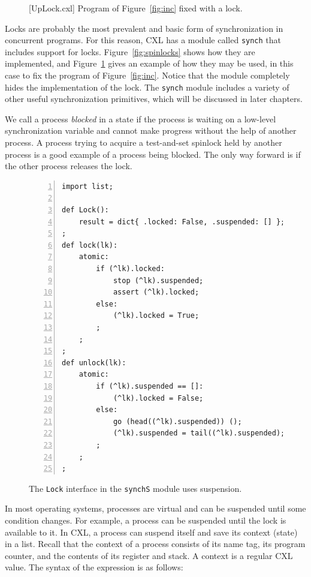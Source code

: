 \documentclass{report}
\newenvironment{code}{
\tcolorbox
}{
\endtcolorbox
}
\begin{document}
\begin{figure}
\begin{code}
\end{code}
\caption{[UpLock.cxl] Program of Figure~\ref{fig:inc} fixed with a lock.}
\label{fig:incfixed}
\end{figure}

Locks are probably the most prevalent and basic form of synchronization
in concurrent programs.  For this reason, CXL has a module called
\texttt{synch} that includes support for locks.
Figure~\ref{fig:spinlocks} shows how they are implemented, and
Figure~\ref{fig:incfixed} gives an example of how they may be used,
in this case to fix the program of Figure~\ref{fig:inc}.
Notice that the module completely hides the implementation of the
lock.
The \texttt{synch} module includes a variety of other useful
synchronization primitives, which will be discussed in later
chapters.

We call a process \emph{blocked}
in a state if the process is waiting on a low-level synchronization
variable and cannot make progress without the help of another process.
A process trying to
acquire a test-and-set spinlock held by another process is a good example
of a process being blocked.
The only way forward is if the other process releases the lock.

\begin{figure}
\begin{code}
\begin{Verbatim}[xleftmargin=5mm,numbers=left]
import list;

def Lock():
    result = dict{ .locked: False, .suspended: [] };
;
def lock(lk):
    atomic:
        if (^lk).locked:
            stop (^lk).suspended;
            assert (^lk).locked;
        else:
            (^lk).locked = True;
        ;
    ;
;
def unlock(lk):
    atomic:
        if (^lk).suspended == []:
            (^lk).locked = False;
        else:
            go (head((^lk).suspended)) ();
            (^lk).suspended = tail((^lk).suspended);
        ;
    ;
;
\end{Verbatim}
\end{code}
\caption{The \texttt{Lock} interface in the \texttt{synchS} module uses suspension.}
\label{fig:suspension}
\end{figure}

In most operating systems, processes are virtual and can be suspended
until some condition changes.  For example, a process can be suspended
until the lock is available to it.
In CXL, a process can suspend itself and save its context (state) in a
list.  Recall that the context of a process consists of its name tag,
its program counter, and the contents of its register and stack.
A context is a regular CXL value.
The syntax of the expression is as follows:
\end{document}
